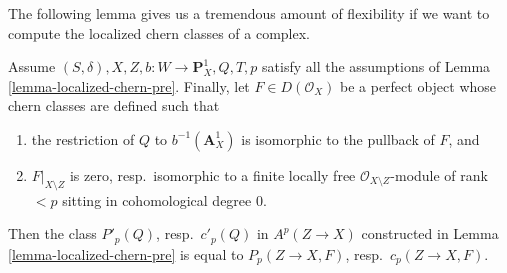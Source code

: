 \noindent
The following lemma gives us a tremendous amount of flexibility
if we want to compute the localized chern classes of a complex.

\begin{lemma}
\label{lemma-independent-loc-chern-bQ}
Assume $(S, \delta), X, Z, b : W \to \mathbf{P}^1_X, Q, T, p$
satisfy all the assumptions of Lemma \ref{lemma-localized-chern-pre}.
Finally, let $F \in D(\mathcal{O}_X)$ be a perfect object whose
chern classes are defined such that
\begin{enumerate}
\item the restriction of $Q$ to $b^{-1}(\mathbf{A}^1_X)$ is
isomorphic to the pullback of $F$, and
\item $F|_{X \setminus Z}$ is zero, resp.\ isomorphic to a finite
locally free $\mathcal{O}_{X \setminus Z}$-module of rank $< p$
sitting in cohomological degree $0$.
\end{enumerate}
Then the class $P'_p(Q)$, resp.\ $c'_p(Q)$ in $A^p(Z \to X)$ constructed
in Lemma \ref{lemma-localized-chern-pre}
is equal to $P_p(Z \to X, F)$, resp.\ $c_p(Z \to X, F)$.
\end{lemma}


